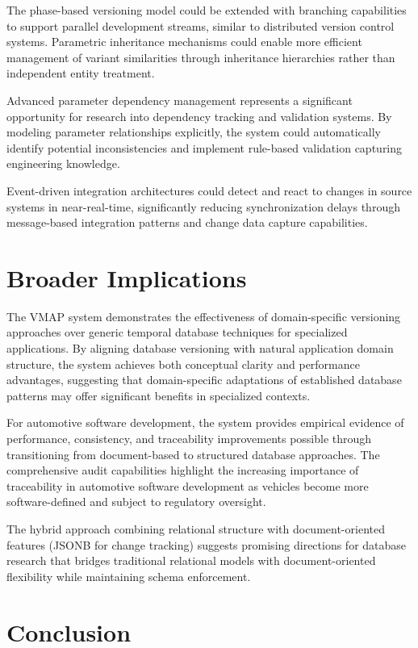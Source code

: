 The phase-based versioning model could be extended with branching capabilities to support parallel development streams, similar to distributed version control systems. Parametric inheritance mechanisms could enable more efficient management of variant similarities through inheritance hierarchies rather than independent entity treatment.

Advanced parameter dependency management represents a significant opportunity for research into dependency tracking and validation systems. By modeling parameter relationships explicitly, the system could automatically identify potential inconsistencies and implement rule-based validation capturing engineering knowledge.

Event-driven integration architectures could detect and react to changes in source systems in near-real-time, significantly reducing synchronization delays through message-based integration patterns and change data capture capabilities.

\section{Broader Implications}
\label{sec:broader-implications}

The \ac{VMAP} system demonstrates the effectiveness of domain-specific versioning approaches over generic temporal database techniques for specialized applications. By aligning database versioning with natural application domain structure, the system achieves both conceptual clarity and performance advantages, suggesting that domain-specific adaptations of established database patterns may offer significant benefits in specialized contexts.

For automotive software development, the system provides empirical evidence of performance, consistency, and traceability improvements possible through transitioning from document-based to structured database approaches. The comprehensive audit capabilities highlight the increasing importance of traceability in automotive software development as vehicles become more software-defined and subject to regulatory oversight.

The hybrid approach combining relational structure with document-oriented features (JSONB for change tracking) suggests promising directions for database research that bridges traditional relational models with document-oriented flexibility while maintaining schema enforcement.

\section{Conclusion}
\label{sec:final-conclusion}

